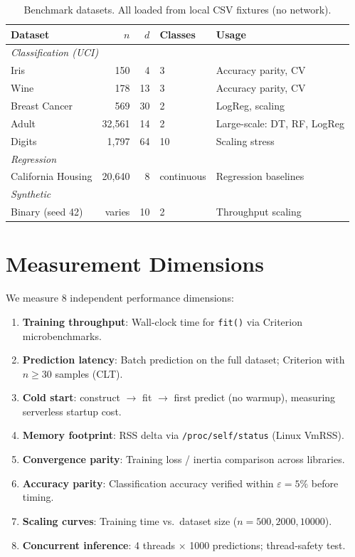 \documentclass[11pt,a4paper]{article}
\begin{document}
\begin{table}[H]
\centering
\caption{Benchmark datasets. All loaded from local CSV fixtures (no network).}
\label{tab:datasets}
\begin{tabular}{lrrll}
\toprule
\textbf{Dataset} & \textbf{$n$} & \textbf{$d$} & \textbf{Classes} & \textbf{Usage} \\
\midrule
\multicolumn{5}{l}{\textit{Classification (UCI)}} \\
Iris & 150 & 4 & 3 & Accuracy parity, CV \\
Wine & 178 & 13 & 3 & Accuracy parity, CV \\
Breast Cancer & 569 & 30 & 2 & LogReg, scaling \\
Adult & 32,561 & 14 & 2 & Large-scale: DT, RF, LogReg \\
Digits & 1,797 & 64 & 10 & Scaling stress \\
\midrule
\multicolumn{5}{l}{\textit{Regression}} \\
California Housing & 20,640 & 8 & continuous & Regression baselines \\
\midrule
\multicolumn{5}{l}{\textit{Synthetic}} \\
Binary (seed 42) & varies & 10 & 2 & Throughput scaling \\
\bottomrule
\end{tabular}
\end{table}

\section{Measurement Dimensions}

We measure 8 independent performance dimensions:

\begin{enumerate}[nosep]
    \item \textbf{Training throughput}: Wall-clock time for
          \texttt{fit()} via Criterion microbenchmarks.
    \item \textbf{Prediction latency}: Batch prediction on the
          full dataset; Criterion with $n \geq 30$ samples (CLT).
    \item \textbf{Cold start}: construct $\to$ fit $\to$ first
          predict (no warmup), measuring serverless startup cost.
    \item \textbf{Memory footprint}: RSS delta via
          \texttt{/proc/self/status} (Linux VmRSS).
    \item \textbf{Convergence parity}: Training loss / inertia
          comparison across libraries.
    \item \textbf{Accuracy parity}: Classification accuracy verified
          within $\varepsilon = 5\%$ before timing.
    \item \textbf{Scaling curves}: Training time vs.\ dataset
          size ($n = 500, 2000, 10000$).
    \item \textbf{Concurrent inference}: 4 threads $\times$ 1000
          predictions; thread-safety test.
\end{enumerate}
\end{document}
